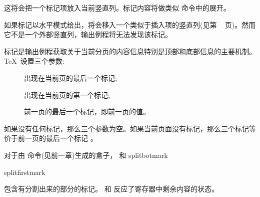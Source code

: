 \documentclass{book}
\begin{document}
\begin{disp}\lb{}\rb\end{disp}

这将会把一个标记项放入当前竖直列。标记内容将做类似  命令中的展开。



如果标记以水平模式给出，将会移入一个类似于插入项的竖直列(见第 ~\pageref{migrate} 页)。然而它不是一个外部竖直列，输出例程将无法发现该标记。



标记是输出例程获取关于当前分页的内容信息特别是顶部和底部信息的主要机制。
\TeX\ 设置三个参数:
\begin{description}
\item []
   出现在当前页的最后一个标记;
\item []
   出现在当前页的第一个标记;
\item []
   前一页的最后一个标记，即前一页的值。
\end{description}

如果没有任何标记，那么三个参数为空。如果当前页面没有标记，那么三个标记等价于前一页的最后一个标记 。


对于由  命令(见前一章)生成的盒子，  和 
\cstoidx splitbotmark\par\cstoidx splitfirstmark\par
包含有分割出来的部分的标记。
和  反应了寄存器中剩余内容的状态。
\end{document}
